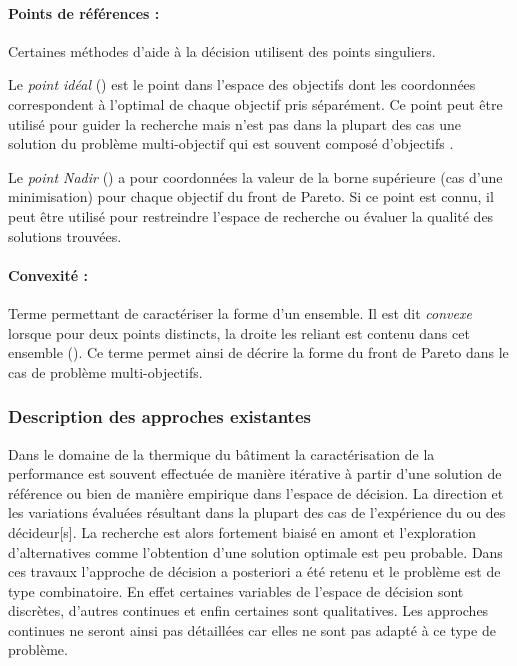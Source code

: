 \paragraph{Points de références : } %
\label{par:points_de_references}
Certaines méthodes d’aide à la décision utilisent des points singuliers.

Le \emph{point idéal} () est le point dans l’espace des objectifs dont
les coordonnées correspondent à l’optimal de chaque objectif pris séparément. Ce point
peut être utilisé pour guider la recherche mais n’est pas dans la plupart des cas
une solution du problème multi-objectif qui est souvent composé d’objectifs
.

Le \emph{point Nadir} () a pour coordonnées la
valeur de la borne supérieure (cas d’une minimisation) pour chaque objectif du front
de Pareto. Si ce point est connu, il peut être utilisé pour restreindre l’espace
de recherche ou évaluer la qualité des solutions trouvées.

\paragraph{Convexité :} %
\label{par:convexite}
Terme permettant de caractériser la forme d’un ensemble.
Il est dit \emph{convexe} lorsque pour deux points distincts, la droite les reliant
est contenu dans cet ensemble (\cite{Collette2002}). Ce terme permet ainsi de décrire
la forme du front de Pareto dans le cas de problème multi-objectifs.

\subsubsection{Description des approches existantes} %
\label{ssub:description_des_approches_existantes}
Dans le domaine de la thermique du bâtiment la caractérisation
de la performance est souvent effectuée de manière itérative à partir d’une solution
de référence ou bien de manière empirique dans l’espace de décision. La direction et
les variations évaluées résultant dans la plupart des cas de l’expérience du ou des
décideur[s]. La recherche est alors fortement biaisé en amont et l’exploration
d’alternatives comme l’obtention d’une solution optimale est peu probable.
Dans ces travaux l’approche de décision a posteriori a été retenu et le problème
est de type combinatoire. En effet certaines variables de l’espace de décision
sont discrètes, d’autres continues et enfin certaines sont qualitatives. Les approches
continues ne seront ainsi pas détaillées car elles ne sont pas adapté à ce type de
problème.

